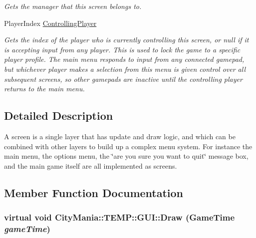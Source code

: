 \begin{DoxyCompactItemize}
\begin{DoxyCompactList}\small\item\em Gets the manager that this screen belongs to. \item\end{DoxyCompactList}\item 
PlayerIndex \hyperlink{classCityMania_1_1TEMP_1_1GUI_aaa8bbe268b5e20cb09fd3703867e98b1}{ControllingPlayer}
\begin{DoxyCompactList}\small\item\em Gets the index of the player who is currently controlling this screen, or null if it is accepting input from any player. This is used to lock the game to a specific player profile. The main menu responds to input from any connected gamepad, but whichever player makes a selection from this menu is given control over all subsequent screens, so other gamepads are inactive until the controlling player returns to the main menu. \item\end{DoxyCompactList}\end{DoxyCompactItemize}


\subsection{Detailed Description}
A screen is a single layer that has update and draw logic, and which can be combined with other layers to build up a complex menu system. For instance the main menu, the options menu, the \char`\"{}are you sure you
        want to quit\char`\"{} message box, and the main game itself are all implemented as screens. 

\subsection{Member Function Documentation}
\hypertarget{classCityMania_1_1TEMP_1_1GUI_a9d5035249dc023e58be6177595b2381b}{
\subsubsection[{Draw}]{\setlength{\rightskip}{0pt plus 5cm}virtual void CityMania::TEMP::GUI::Draw (GameTime {\em gameTime})}}
\label{classCityMania_1_1TEMP_1_1GUI_a9d5035249dc023e58be6177595b2381b}


